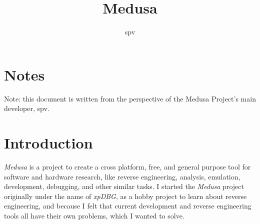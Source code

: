 \documentclass{article}
\title{Medusa}
\author{spv}
\begin{document}
	\maketitle

    \section{Notes}
    Note: this document is written from the perspective of the Medusa Project's
    main developer, spv.

    \section{Introduction}
	\textit{Medusa} is a project to create a cross platform, free, and general
    purpose tool for software and hardware research, like reverse engineering,
    analysis, emulation, development, debugging, and other similar tasks. I
    started the \textit{Medusa} project originally under the name of
    \textit{xpDBG}, as a hobby project to learn about reverse engineering, and
    because I felt that current development and reverse engineering tools all
    have their own problems, which I wanted to solve.
\end{document}
